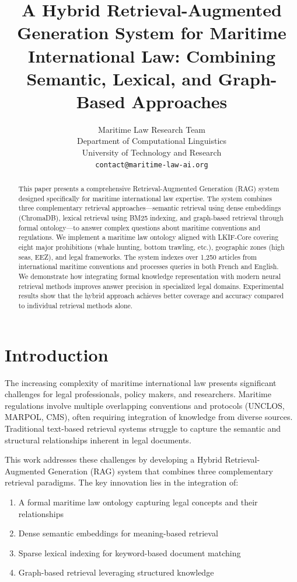 \documentclass[11pt,a4paper]{article}
\title{A Hybrid Retrieval-Augmented Generation System for Maritime International Law: Combining Semantic, Lexical, and Graph-Based Approaches}
\author{Maritime Law Research Team \\
  Department of Computational Linguistics \\
  University of Technology and Research \\
  \texttt{contact@maritime-law-ai.org} \\}
\date{}
\begin{document}
\maketitle
\begin{abstract}
This paper presents a comprehensive Retrieval-Augmented Generation (RAG) system designed specifically for maritime international law expertise. The system combines three complementary retrieval approaches---semantic retrieval using dense embeddings (ChromaDB), lexical retrieval using BM25 indexing, and graph-based retrieval through formal ontology---to answer complex questions about maritime conventions and regulations. We implement a maritime law ontology aligned with LKIF-Core covering eight major prohibitions (whale hunting, bottom trawling, etc.), geographic zones (high seas, EEZ), and legal frameworks. The system indexes over 1,250 articles from international maritime conventions and processes queries in both French and English. We demonstrate how integrating formal knowledge representation with modern neural retrieval methods improves answer precision in specialized legal domains. Experimental results show that the hybrid approach achieves better coverage and accuracy compared to individual retrieval methods alone.
\end{abstract}

\section{Introduction}

The increasing complexity of maritime international law presents significant challenges for legal professionals, policy makers, and researchers. Maritime regulations involve multiple overlapping conventions and protocols (UNCLOS, MARPOL, CMS), often requiring integration of knowledge from diverse sources. Traditional text-based retrieval systems struggle to capture the semantic and structural relationships inherent in legal documents.

This work addresses these challenges by developing a Hybrid Retrieval-Augmented Generation (RAG) system that combines three complementary retrieval paradigms. The key innovation lies in the integration of:
\begin{enumerate}
\item A formal maritime law ontology capturing legal concepts and their relationships
\item Dense semantic embeddings for meaning-based retrieval
\item Sparse lexical indexing for keyword-based document matching
\item Graph-based retrieval leveraging structured knowledge
\end{enumerate}
\end{document}
